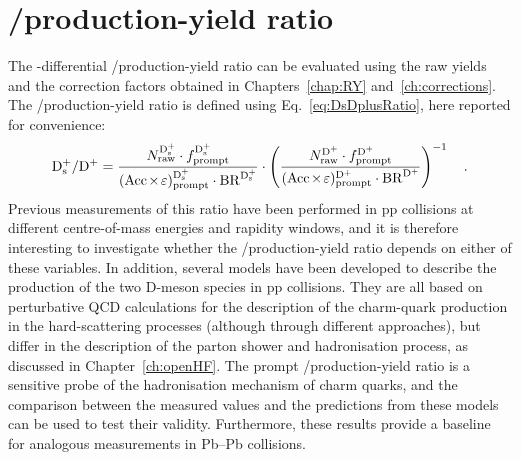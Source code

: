 \chapter{\texorpdfstring{\ds/\dpl production-yield ratio}{Ds+/D+ production-yield ratio}}\label{ch:results}
The \pt-differential \ds/\dpl production-yield ratio can be evaluated using the raw yields and the correction factors obtained in Chapters~\ref{chap:RY} and~\ref{ch:corrections}. The \ds/\dpl production-yield ratio is defined using Eq.~\ref{eq:DsDplusRatio}, here reported for convenience:
\begin{equation*}
    \mathrm{D_s^+}/\mathrm{D^+} = \frac{N_\mathrm{raw}^{\mathrm{D_s^+}}\cdot f_\mathrm{prompt}^\mathrm{D_s^+}}{(\mathrm{Acc}\mkern-2mu\times\mkern-2mu\varepsilon)_\mathrm{prompt}^\mathrm{D_s^+} \cdot \mathrm{BR}^\mathrm{D_s^+}} \cdot \left(\frac{N_\mathrm{raw}^{\mathrm{D^+}}\cdot f_\mathrm{prompt}^\mathrm{D^+}}{(\mathrm{Acc}\mkern-2mu\times\mkern-2mu\varepsilon)_\mathrm{prompt}^\mathrm{D^+} \cdot \mathrm{BR}^\mathrm{D^+}}\right)^{-1}\quad .
\end{equation*}
Previous measurements of this ratio have been performed in pp collisions at different centre-of-mass energies and rapidity windows, and it is therefore interesting to investigate whether the \ds/\dpl production-yield ratio depends on either of these variables. In addition, several models have been developed to describe the production of the two D-meson species in pp collisions. They are all based on perturbative QCD calculations for the description of the charm-quark production in the hard-scattering processes (although through different approaches), but differ in the description of the parton shower and hadronisation process, as discussed in Chapter~\ref{ch:openHF}. The prompt \ds/\dpl production-yield ratio is a sensitive probe of the hadronisation mechanism of charm quarks, and the comparison between the measured values and the predictions from these models can be used to test their validity. Furthermore, these results provide a baseline for analogous measurements in Pb--Pb collisions.

